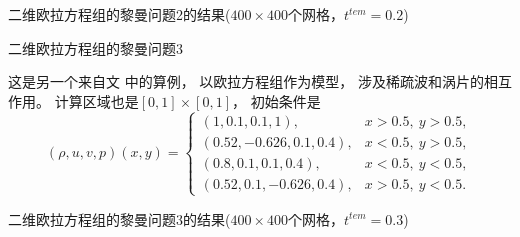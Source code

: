 \documentclass[aspectratio=169]{beamer}
\begin{document}
\begin{frame}{二维欧拉方程组的黎曼问题2的结果($400 \times 400$个网格，$t^{tem}=0.2$)}
  
  \begin{figure}[htbp]
    \centering
    \hspace{0.05\textwidth}
  \end{figure}
  
\end{frame}

\begin{frame}{二维欧拉方程组的黎曼问题3}
  
  \begin{example}[二维欧拉方程组的黎曼问题3]
    \label{ex:RP3}
    这是另一个来自文 \citep{RPexample} 中的算例，
    以欧拉方程组作为模型，
    涉及稀疏波和涡片的相互作用。
    计算区域也是$[0,1]\times[0,1]$，
    初始条件是
    \begin{equation*}
      (\rho, u, v, p) (x, y)=
      \begin{cases}
        (1, 0.1, 0.1, 1),         & x>0.5,~y>0.5,  \\
        (0.52, -0.626, 0.1, 0.4), & x<0.5,~y>0.5,  \\
        (0.8, 0.1, 0.1, 0.4),     & x<0.5,~y<0.5,  \\
        (0.52, 0.1, -0.626, 0.4), & x>0.5,~y<0.5.
      \end{cases}
    \end{equation*}
  \end{example}
  
\end{frame}

\begin{frame}{二维欧拉方程组的黎曼问题3的结果($400 \times 400$个网格，$t^{tem}=0.3$)}
  
  \begin{figure}[htbp]
    \centering
    \hspace{0.05\textwidth}
  \end{figure}
  
\end{frame}
\end{document}
